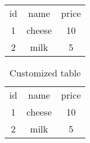 \documentclass{article}
\begin{document}
\begin{table}[h!]
\begin{tabular}{ c c c }
id & name & price \\
1 & cheese & 10 \\
2 & milk & 5 \\
\end{tabular}
\end{table}
\begin{table}[h!]
\centering
\begin{tabular}{ c|c|c }
id & name & price \\
1 & cheese & 10 \\
2 & milk & 5 \\
\end{tabular}
\caption{Customized table}
\end{table}
\end{document}
